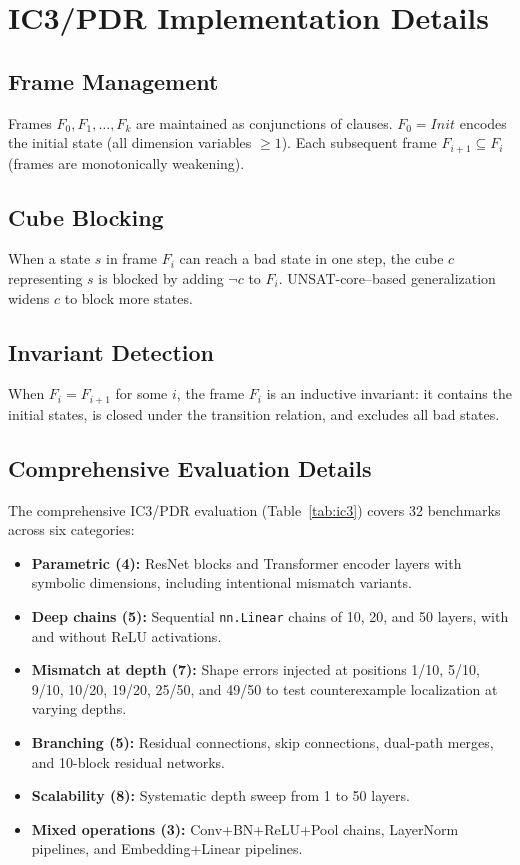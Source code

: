 \documentclass[11pt]{article}
\begin{document}
\section{IC3/PDR Implementation Details}\label{app:ic3-details}

\subsection{Frame Management}

Frames $F_0, F_1, \ldots, F_k$ are maintained as conjunctions of
clauses.  $F_0 = \mathit{Init}$ encodes the initial state
(all dimension variables $\geq 1$).  Each subsequent frame
$F_{i+1} \subseteq F_i$ (frames are monotonically weakening).

\subsection{Cube Blocking}

When a state $s$ in frame $F_i$ can reach a bad state in one step,
the cube $c$ representing $s$ is blocked by adding $\neg c$ to $F_i$.
UNSAT-core--based generalization widens $c$ to block more states.

\subsection{Invariant Detection}

When $F_i = F_{i+1}$ for some $i$, the frame $F_i$ is an inductive
invariant: it contains the initial states, is closed under the
transition relation, and excludes all bad states.

\subsection{Comprehensive Evaluation Details}

The comprehensive IC3/PDR evaluation (Table~\ref{tab:ic3}) covers 32 benchmarks
across six categories:
\begin{itemize}[leftmargin=2em]
  \item \textbf{Parametric (4):} ResNet blocks and Transformer encoder layers
    with symbolic dimensions, including intentional mismatch variants.
  \item \textbf{Deep chains (5):} Sequential \texttt{nn.Linear} chains of
    10, 20, and 50 layers, with and without ReLU activations.
  \item \textbf{Mismatch at depth (7):} Shape errors injected at positions
    1/10, 5/10, 9/10, 10/20, 19/20, 25/50, and 49/50 to test counterexample
    localization at varying depths.
  \item \textbf{Branching (5):} Residual connections, skip connections,
    dual-path merges, and 10-block residual networks.
  \item \textbf{Scalability (8):} Systematic depth sweep from 1 to 50 layers.
  \item \textbf{Mixed operations (3):} Conv+BN+ReLU+Pool chains, LayerNorm
    pipelines, and Embedding+Linear pipelines.
\end{itemize}
\end{document}
